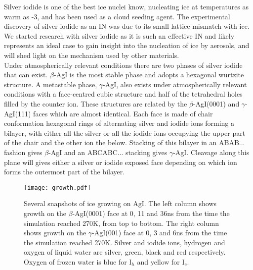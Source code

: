 \documentclass[titlepage]{article}
\begin{document}
\indent Silver iodide is one of the best ice nuclei know\cite{PK10}, nucleating ice at temperatures as warm as -3\celsius, and has been used as a cloud seeding agent\cite{B99}.  The experimental discovery of silver iodide as an IN was due to its small lattice mismatch with ice\cite{V47}.  We started research with silver iodide as it is such an effective IN and likely represents an ideal case to gain insight into the nucleation of ice by aerosols, and will shed light on the mechanism used by other materials.\\  
\indent Under atmospherically relevant conditions there are two phases of silver iodide that can exist\cite{HK99}.  $\beta$-AgI is the most stable phase and adopts a hexagonal wurtzite structure.  A metastable phase, $\gamma$-AgI, also exists under atmospherically relevant conditions with a face-centred cubic structure and half of the tetrahedral holes filled by the counter ion.  These structures are related by the $\beta$-AgI(0001) and $\gamma$-AgI(111) faces which are almost identical.  Each face is made of chair conformation hexagonal rings of alternating silver and iodide ions forming a bilayer, with either all the silver or all the iodide ions occupying the upper part of the chair and the other ion the below.  Stacking of this bilayer in an ABAB... fashion gives $\beta$-AgI and an ABCABC... stacking gives $\gamma$-AgI.  Cleavage along this plane will gives either a silver or iodide exposed face depending on which ion forms the outermost part of the bilayer.\\
\begin{wrapfigure}{lhtp}{8cm}
	\begin{center}
		\texttt{[image: growth.pdf]}
		\singlespacing\caption{Several snapshots of ice growing on AgI.  The left column shows growth on the $\beta$-AgI(0001) face at 0, 11 and 36ns from the time the simulation reached 270K, from top to bottom.  The right column shows growth on the $\gamma$-AgI(001) face at 0, 3 and 6ns from the time the simulation reached 270K.  Silver and iodide ions, hydrogen and oxygen of liquid water are silver, green, black and red respectively.  Oxygen of frozen water is blue for I$_{h}$ and yellow for I$_{c}$.}
	\label{growthpic}
	\end{center}
	
\end{wrapfigure}
\end{document}
